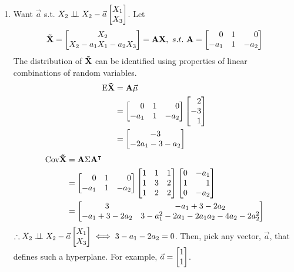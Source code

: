 \begin{enumerate}
	\item Want $\vec{a}$ s.t. $X_2 \indep X_2 - \vec{a} \m{X_1 \\ X_3}$. Let 
		$$
		\mf{\tilde{X}} = \begin{bmatrix*}[c]X_2 \\ X_2 - a_1X_1 - a_2X_3\end{bmatrix*} = \mf{A} \mf{X},\ s.t.\ 
		\mf{A} = \m{0 & 1 & 0 \\ -a_1 & 1 & -a_2}
		$$
		The distribution of $\mathrm{\bf{\tilde{X}}}$ can be identified using properties of linear combinations of random variables.
		\begin{align*}
			\E{\mf{\tilde{X}}} &= \mf{A}\vec{\mu} \\
			&= \m{0 & 1 & 0 \\ -a_1 & 1 & -a_2} \m{2 \\ -3 \\ 1} \\
			&= \begin{bmatrix*}[c] -3 \\ -2a_1 -3 -a_2 \end{bmatrix*}
		\end{align*}
		\begin{align*}
			\Cov{\mf{\tilde{X}}} &= \mf{A} \Sigma \mf{A}^{\T} \\
			&= \m{0 & 1 & 0 \\ -a_1 & 1 & -a_2} \m{1 & 1 & 1 \\ 1 & 3 & 2 \\ 1 & 2 & 2} \m{0 & -a_1 \\ 1 & 1 \\ 0 & -a_2} \\
			&= \begin{bmatrix*} 3 & -a_1 + 3 -2a_2 \\ -a_1 + 3 -2a_2 & 3 -a_1^2 - 2a_1 - 2a_1a_2 - 4a_2 - 2a_2^2 \end{bmatrix*}
		\end{align*}
		$\therefore X_2 \indep X_2 - \vec{a} \m{X_1 \\ X_3} \iff 3 - a_1 - 2a_2 = 0$. Then, pick any vector, $\vec{a}$, that defines such a hyperplane. For example, $\vec{a} = \m{1 \\ 1}$.
\end{enumerate}

\newpage
